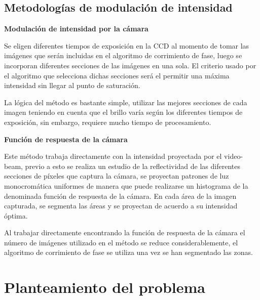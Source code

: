 \documentclass[UTF8]{article}
\begin{document}
\subsection{Metodologías de modulación de intensidad}

\textbf{Modulación de intensidad por la cámara} 

Se eligen diferentes tiempos de exposición en la CCD al momento de tomar las imágenes que serán incluidas en el algoritmo de corrimiento de fase, luego se incorporan diferentes secciones de las imágenes en una sola. El criterio usado por el algoritmo que selecciona dichas secciones será el permitir una máxima intensidad sin llegar al punto de saturación.

La lógica del método es bastante simple, utilizar las mejores secciones de cada imagen teniendo en cuenta que el brillo varía según los diferentes tiempos de exposición, sin embargo, requiere mucho tiempo de procesamiento.
\medskip


\textbf{Función de respuesta de la cámara}

Este método trabaja directamente con la intensidad proyectada por el video-beam, previo a esto se realiza un estudio de la reflectividad de las diferentes secciones de píxeles que captura la cámara, se proyectan patrones de luz monocromática uniformes de manera que puede realizarse un histograma de la denominada función de respuesta de la cámara. En cada área de la imagen capturada, se segmenta las áreas y se proyectan de acuerdo a su intensidad óptima.
\medskip

Al trabajar directamente encontrando la función de respuesta de la cámara el número de imágenes utilizado en el método se reduce considerablemente, el algoritmo de corrimiento de fase se utiliza una vez se han segmentado las zonas.













\section{Planteamiento del problema} %

\end{document}
